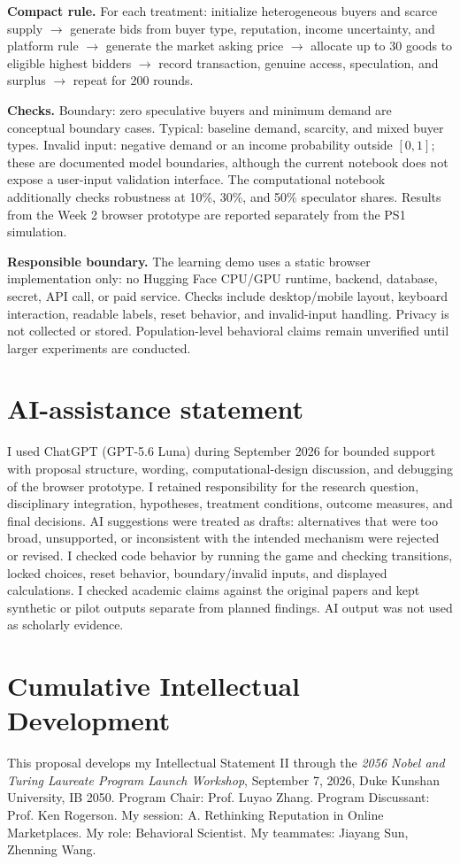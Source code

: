 \textbf{Compact rule.} For each treatment: initialize heterogeneous buyers and scarce supply $\rightarrow$ generate bids from buyer type, reputation, income uncertainty, and platform rule $\rightarrow$ generate the market asking price $\rightarrow$ allocate up to 30 goods to eligible highest bidders $\rightarrow$ record transaction, genuine access, speculation, and surplus $\rightarrow$ repeat for 200 rounds.

\textbf{Checks.} Boundary: zero speculative buyers and minimum demand are conceptual boundary cases. Typical: baseline demand, scarcity, and mixed buyer types. Invalid input: negative demand or an income probability outside $[0,1]$; these are documented model boundaries, although the current notebook does not expose a user-input validation interface. The computational notebook additionally checks robustness at 10\%, 30\%, and 50\% speculator shares. Results from the Week 2 browser prototype are reported separately from the PS1 simulation.

\textbf{Responsible boundary.} The learning demo uses a static browser implementation only: no Hugging Face CPU/GPU runtime, backend, database, secret, API call, or paid service. Checks include desktop/mobile layout, keyboard interaction, readable labels, reset behavior, and invalid-input handling. Privacy is not collected or stored. Population-level behavioral claims remain unverified until larger experiments are conducted.

\section{AI-assistance statement}
I used ChatGPT (GPT-5.6 Luna) during September 2026 for bounded support with proposal structure, wording, computational-design discussion, and debugging of the browser prototype. I retained responsibility for the research question, disciplinary integration, hypotheses, treatment conditions, outcome measures, and final decisions. AI suggestions were treated as drafts: alternatives that were too broad, unsupported, or inconsistent with the intended mechanism were rejected or revised. I checked code behavior by running the game and checking transitions, locked choices, reset behavior, boundary/invalid inputs, and displayed calculations. I checked academic claims against the original papers and kept synthetic or pilot outputs separate from planned findings. AI output was not used as scholarly evidence.

\section{Cumulative Intellectual Development}
This proposal develops my Intellectual Statement II through the \emph{2056 Nobel and Turing Laureate Program Launch Workshop}, September 7, 2026, Duke Kunshan University, IB 2050. Program Chair: Prof. Luyao Zhang. Program Discussant: Prof. Ken Rogerson. My session: A. Rethinking Reputation in Online Marketplaces. My role: Behavioral Scientist. My teammates: Jiayang Sun, Zhenning Wang.

